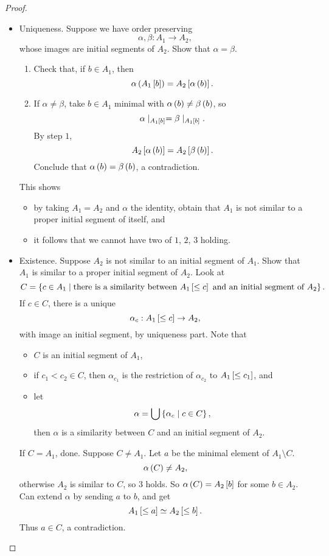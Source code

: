 \begin{proof}
\hfill
\begin{itemize}
\item Uniqueness. Suppose we have order preserving
$$ \alpha, \beta : A_1 \to A_2, $$
whose images are initial segments of $ A_2 $. Show that $ \alpha = \beta $.
\begin{enumerate}[leftmargin=0.5in, label=Step \arabic*.]
\item Check that, if $ b \in A_1 $, then
$$ \alpha\rb{A_1\sb{b}} = A_2\sb{\alpha\rb{b}}. $$
\item If $ \alpha \ne \beta $, take $ b \in A_1 $ minimal with $ \alpha\rb{b} \ne \beta\rb{b} $, so
$$ \alpha \mid_{A_1\sb{b}} = \beta \mid_{A_1\sb{b}}. $$
By step $ 1 $,
$$ A_2\sb{\alpha\rb{b}} = A_2\sb{\beta\rb{b}}. $$
Conclude that $ \alpha\rb{b} = \beta\rb{b} $, a contradiction.
\end{enumerate}
This shows
\begin{itemize}
\item by taking $ A_1 = A_2 $ and $ \alpha $ the identity, obtain that $ A_1 $ is not similar to a proper initial segment of itself, and
\item it follows that we cannot have two of $ 1 $, $ 2 $, $ 3 $ holding.
\end{itemize}
\item Existence. Suppose $ A_2 $ is not similar to an initial segment of $ A_1 $. Show that $ A_1 $ is similar to a proper initial segment of $ A_2 $. Look at
$$ C = \cb{c \in A_1 \mid \text{there is a similarity between} \ A_1\sb{\le c} \ \text{and an initial segment of} \ A_2}. $$
If $ c \in C $, there is a unique
$$ \alpha_c : A_1\sb{\le c} \to A_2, $$
with image an initial segment, by uniqueness part. Note that
\begin{itemize}
\item $ C $ is an initial segment of $ A_1 $,
\item if $ c_1 < c_2 \in C $, then $ \alpha_{c_1} $ is the restriction of $ \alpha_{c_2} $ to $ A_1\sb{\le c_1} $, and
\item let
$$ \alpha = \bigcup \cb{\alpha_c \mid c \in C}, $$
then $ \alpha $ is a similarity between $ C $ and an initial segment of $ A_2 $.
\end{itemize}
If $ C = A_1 $, done. Suppose $ C \ne A_1 $. Let $ a $ be the minimal element of $ A_1 \setminus C $.
$$ \alpha\rb{C} \ne A_2, $$
otherwise $ A_2 $ is similar to $ C $, so $ 3 $ holds. So $ \alpha\rb{C} = A_2\sb{b} $ for some $ b \in A_2 $. Can extend $ \alpha $ by sending $ a $ to $ b $, and get
$$ A_1\sb{\le a} \simeq A_2\sb{\le b}. $$
Thus $ a \in C $, a contradiction.
\end{itemize}
\end{proof}

